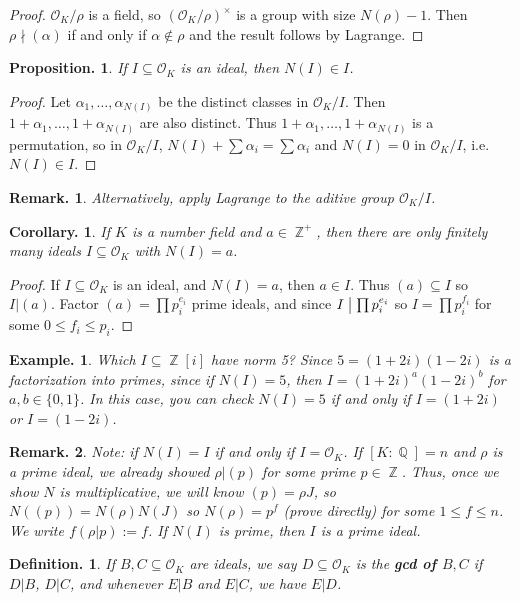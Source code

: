 \documentclass[11pt, a4paper]{memoir}
\DeclareMathOperator{\Q}{{\mathbb{Q}}}
\DeclareMathOperator{\Z}{{\mathbb{Z}}}
\renewcommand{\div}{\bigm|}
\theoremstyle{change}
\newtheorem{corollary}[theorem]{Corollary.}
\newtheorem{proposition}[theorem]{Proposition.}
\theoremstyle{plain}
\theoremstyle{nonumberplain}
\newtheorem{definition}{Definition.}
\newtheorem{example}{Example.}
\newtheorem{remark}{Remark.}
\newtheorem{proof}{Proof}
\newcommand{\mbf}[1]{{\boldmath\bfseries #1}}
\numberwithin{equation}{section}
\begin{document}
\begin{proof}
    $\mathcal{O}_K/\rho$ is a field, so $(\mathcal{O}_K/\rho)^\times$ is a group with size $N(\rho)-1$.
    Then $\rho\nmid(\alpha)$ if and only if $\alpha\notin\rho$ and the result follows by Lagrange.
\end{proof}
\begin{proposition}
    If $I\subseteq\mathcal{O}_K$ is an ideal, then $N(I)\in I$.
\end{proposition}
\begin{proof}
    Let $\alpha_1,\ldots,\alpha_{N(I)}$ be the distinct classes in $\mathcal{O}_K/I$.
    Then $1+\alpha_1,\ldots,1+\alpha_{N(I)}$ are also distinct.
    Thus $1+\alpha_1,\ldots,1+\alpha_{N(I)}$ is a permutation, so in $\mathcal{O}_K/I$, $N(I)+\sum\alpha_i=\sum\alpha_i$ and $N(I)=0$ in $\mathcal{O}_K/I$, i.e. $N(I)\in I$.
\end{proof}
\begin{remark}
    Alternatively, apply Lagrange to the aditive group $\mathcal{O}_K/I$.
\end{remark}
\begin{corollary}
    If $K$ is a number field and $a\in\Z^+$, then there are only finitely many ideals $I\subseteq\mathcal{O}_K$ with $N(I)=a$.
\end{corollary}
\begin{proof}
    If $I\subseteq\mathcal{O}_K$ is an ideal, and $N(I)=a$, then $a\in I$.
    Thus $(a)\subseteq I$ so $I|(a)$.
    Factor $(a)=\prod p_i^{e_i}$ prime ideals, and since $I\div\prod p_i^{e_i}$ so $I=\prod p_i^{f_i}$ for some $0\leq f_i\leq p_i$.
\end{proof}
\begin{example}
    Which $I\subseteq\Z[i]$ have norm 5?
    Since $5=(1+2i)(1-2i)$ is a factorization into primes, since if $N(I)=5$, then $I=(1+2i)^a(1-2i)^b$ for $a,b\in\{0,1\}$.
    In this case, you can check $N(I)=5$ if and only if $I=(1+2i)$ or $I=(1-2i)$.
\end{example}
\begin{remark}
    Note: if $N(I)=I$ if and only if $I=\mathcal{O}_K$.
    If $[K:\Q]=n$ and $\rho$ is a prime ideal, we already showed $\rho|(p)$ for some prime $p\in\Z$.
    Thus, once we show $N$ is multiplicative, we will know $(p)=\rho J$, so $N((p))=N(\rho)N(J)$ so $N(\rho)=p^f$ (prove directly) for some $1\leq f\leq n$.
    We write $f(\rho|p):=f$.
    If $N(I)$ is prime, then $I$ is a prime ideal.
\end{remark}
\begin{definition}
    If $B,C\subseteq\mathcal{O}_K$ are ideals, we say $D\subseteq\mathcal{O}_K$ is the \mbf{gcd of $B,C$} if $D|B$, $D|C$, and whenever $E|B$ and $E|C$, we have $E|D$.
\end{definition}
\end{document}
